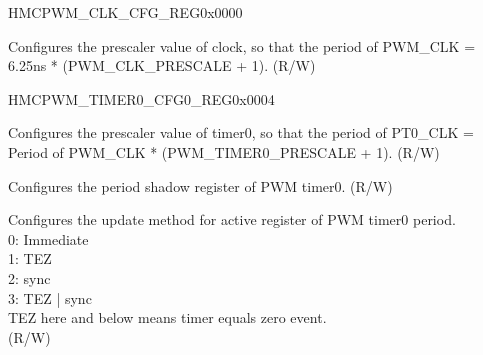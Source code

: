 \begin{register}{H}{MCPWM\_CLK\_CFG\_REG}{0x0000}\label{regdesc:MCPWMCLKCFGREG}
%
%
\regnewline%
\begin{regdesc}\begin{reglist}
\label{fielddesc:MCPWMCLKPRESCALE}\item [MCPWM\_CLK\_PRESCALE] Configures the prescaler value of clock, so that the period of PWM\_CLK = 6.25ns * (PWM\_CLK\_PRESCALE + 1). (R/W)
\end{reglist}\end{regdesc}
\end{register}


\begin{register}{H}{MCPWM\_TIMER0\_CFG0\_REG}{0x0004}\label{regdesc:MCPWMTIMER0CFG0REG}
%
%
%
%
\regnewline%
\begin{regdesc}\begin{reglist}
\label{fielddesc:MCPWMTIMER0PRESCALE}\item [MCPWM\_TIMER0\_PRESCALE] Configures the prescaler value of timer0, so that the period of PT0\_CLK = Period of PWM\_CLK * (PWM\_TIMER0\_PRESCALE + 1). (R/W)
\label{fielddesc:MCPWMTIMER0PERIOD}\item [MCPWM\_TIMER0\_PERIOD] Configures the period shadow register of PWM timer0. (R/W)
\label{fielddesc:MCPWMTIMER0PERIODUPMETHOD}\item [MCPWM\_TIMER0\_PERIOD\_UPMETHOD] Configures the update method for active register of PWM timer0 period.\\
0: Immediate\\
1: TEZ\\
2: sync\\
3: TEZ | sync\\
TEZ here and below means timer equals zero event.\\
 (R/W)
\end{reglist}\end{regdesc}
\end{register}


